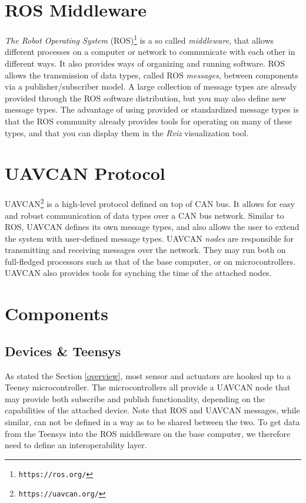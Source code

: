 \documentclass[9pt,technote]{IEEEtran} %
\begin{document}
\section{ROS Middleware}
\label{ros}

\textit{The Robot Operating System} (ROS)\footnote{\texttt{https://ros.org/}} is a so called \textit{middleware}, that allows different processes on
a computer or network to communicate with each other in different ways.
It also provides ways of organizing and running software. ROS allows the transmission of data types,
called ROS \textit{messages}, between components via a publisher/subscriber model.
A large collection of message types are already
provided through the ROS software distribution, but you may also define new message types.
The advantage of using provided or standardized message types is that the ROS community
already provides tools for operating on many of these types,
and that you can display them in the \textit{Rviz} visualization tool.

\section{UAVCAN Protocol}
\label{uavcan}

UAVCAN\footnote{\texttt{https://uavcan.org/}} is a high-level protocol defined on top of CAN bus. It allows for easy and robust
communication of data types over a CAN bus network. Similar to ROS, UAVCAN defines its
own message types, and also allows the user to extend the system with user-defined message types.
UAVCAN \textit{nodes} are responsible for transmitting and receiving messages over the network.
They may run both on full-fledged processors such as that of the base computer, or on microcontrollers.
UAVCAN also provides tools for synching the time of the attached nodes.

\section{Components}
\label{components}

\subsection{Devices \& Teensys}

As stated the Section \ref{overview}, most sensor and actuators are hooked up to a Teensy microcontroller.
The microcontrollers all provide a UAVCAN node that may provide both subscribe and publish
functionality, depending on the capabilities of the attached device.
Note that ROS and UAVCAN messages, while similar, can not be defined in a way
as to be shared between the two. To get data from the Teensys into the ROS middleware
on the base computer, we therefore need to define an interoperability layer.
\end{document}
